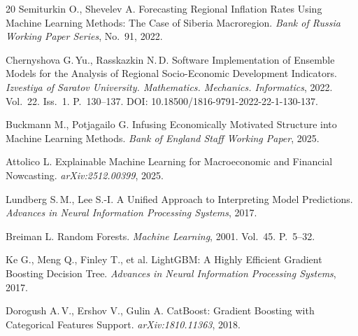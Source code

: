 \documentclass[12pt,a4paper]{article}
\begin{document}
\begin{thebibliography}{20}
Semiturkin O., Shevelev A.
Forecasting Regional Inflation Rates Using Machine Learning Methods:
The Case of Siberia Macroregion.
\textit{Bank of Russia Working Paper Series}, No.~91, 2022.

Chernyshova G.\,Yu., Rasskazkin N.\,D.
Software Implementation of Ensemble Models for the Analysis of
Regional Socio-Economic Development Indicators.
\textit{Izvestiya of Saratov University. Mathematics. Mechanics.
Informatics}, 2022. Vol.~22. Iss.~1. P.~130--137.
DOI: 10.18500/1816-9791-2022-22-1-130-137.

Buckmann M., Potjagailo G.
Infusing Economically Motivated Structure into Machine Learning Methods.
\textit{Bank of England Staff Working Paper}, 2025.

Attolico L.
Explainable Machine Learning for Macroeconomic and Financial
Nowcasting. \textit{arXiv:2512.00399}, 2025.

Lundberg S.\,M., Lee S.-I.
A Unified Approach to Interpreting Model Predictions.
\textit{Advances in Neural Information Processing Systems}, 2017.

Breiman L. Random Forests.
\textit{Machine Learning}, 2001. Vol.~45. P.~5--32.

Ke G., Meng Q., Finley T., et al.
LightGBM: A Highly Efficient Gradient Boosting Decision Tree.
\textit{Advances in Neural Information Processing Systems}, 2017.

Dorogush A.\,V., Ershov V., Gulin A.
CatBoost: Gradient Boosting with Categorical Features Support.
\textit{arXiv:1810.11363}, 2018.

\end{thebibliography}
\end{document}
